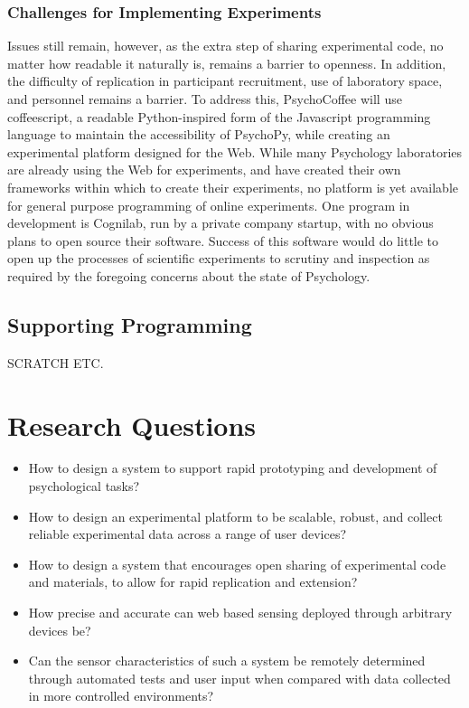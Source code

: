 \documentclass[12pt,a4paper,titlepage]{scrreprt}
\begin{document}
\subsection{Challenges for Implementing Experiments}
Issues still remain, however, as the extra step of sharing experimental code, no matter how readable it naturally is, remains a barrier to openness. In addition, the difficulty of replication in participant recruitment, use of laboratory space, and personnel remains a barrier. To address this, PsychoCoffee will use coffeescript, a readable Python-inspired form of the Javascript programming language to maintain the accessibility of PsychoPy, while creating an experimental platform designed for the Web.
While many Psychology laboratories are already using the Web for experiments, and have created their own frameworks within which to create their experiments\cite{krantz_comparing_1997,germine_is_2012}, no platform is yet available for general purpose programming of online experiments. One program in development is Cognilab\cite{_cognilab_????}, run by a private company startup, with no obvious plans to open source their software. Success of this software would do little to open up the processes of scientific experiments to scrutiny and inspection as required by the foregoing concerns about the state of Psychology.
\section{Supporting Programming}
SCRATCH ETC.
\chapter{Research Questions}
\begin{itemize}
\item How to design a system to support rapid prototyping and development of psychological tasks?
\item How to design an experimental platform to be scalable, robust, and collect reliable experimental data across a range of user devices?
\item How to design a system that encourages open sharing of experimental code and materials, to allow for rapid replication and extension?
\item How precise and accurate can web based sensing deployed through arbitrary devices be?
\item Can the sensor characteristics of such a system be remotely determined through automated tests and user input when compared with data collected in more controlled environments?
\end{itemize}
\end{document}
